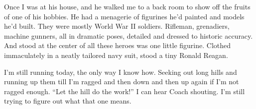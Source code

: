 \documentclass[14pt, oneside]{memoir}
\begin{document}
Once I was at his house, and he walked me to a back room to show off
the fruits of one of his hobbies.
He had a menagerie of figurines he'd painted and models he'd built.
They were mostly World War II soldiers.
Rifleman, grenadiers, machine gunners, all in dramatic poses, detailed
and dressed to historic accuracy.
And stood at the center of all these heroes was one little figurine.
Clothed immaculately in a neatly tailored navy suit, stood a
tiny Ronald Reagan.

I'm still running today, the only way I know how.
Seeking out long hills and running up them till I'm ragged and then
down and then up again if I'm not ragged enough.
``Let the hill do the work!'' I can hear Coach shouting.
I'm still trying to figure out what that one means.
\end{document}
